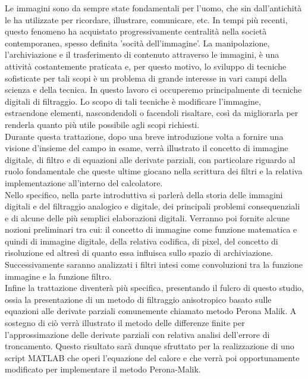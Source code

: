 Le immagini sono da sempre state fondamentali per l'uomo, che sin dall'antichità le ha utilizzate per ricordare, illustrare, comunicare, etc. In tempi più recenti, questo fenomeno ha acquistato progressivamente centralità nella società contemporanea, spesso definita 'socità dell'immagine'. La manipolazione, l'archiviazione e il trasferimento di contenuto attraverso le immagini, è una attività costantemente praticata e, per questo motivo, lo sviluppo di tecniche sofisticate per tali scopi è un problema di grande interesse in vari campi della scienza e della tecnica. In questo lavoro ci occuperemo principalmente di tecniche digitali di filtraggio. Lo scopo di tali tecniche è modificare l'immagine, estraendone elementi, nascondendoli o facendoli risaltare, così da migliorarla per renderla quanto più utile possibile agli scopi richiesti.\\
Durante questa trattazione, dopo una breve introduzione volta a fornire una visione d'insieme del campo in esame, verrà illustrato il concetto di immagine digitale, di filtro e di equazioni alle derivate parziali, con particolare riguardo al ruolo fondamentale che queste ultime giocano nella scrittura dei filtri e la relativa implementazione all'interno del calcolatore.\\
Nello specifico, nella parte introduttiva si parlerà della storia delle immagini digitali e del filtraggio analogico e digitale, dei principali problemi consequenziali e di alcune delle più semplici elaborazioni digitali. Verranno poi fornite alcune nozioni preliminari tra cui: il concetto di immagine come funzione matematica e quindi di immagine digitale, della relativa codifica, di pixel, del concetto di risoluzione ed altresì di quanto essa influisca sullo spazio di archiviazione. Successivamente saranno analizzati i filtri intesi come convoluzioni tra la funzione immagine e la funzione filtro.\\
Infine la trattazione diventerà più specifica, presentando il fulcro di questo studio, ossia la presentazione di un metodo di filtraggio anisotropico basato sulle equazioni alle derivate parziali comunemente chiamato metodo Perona Malik. A sostegno di ciò verrà illustrato il metodo delle differenze finite per l'approssimazione delle derivate parziali con relativa analisi dell'errore di troncamento. Questo risultato sarà dunque sfruttato per la realizzazione di uno script MATLAB che operi l'equazione del calore e che verrà poi opportunamente modificato per implementare il metodo Perona-Malik.   